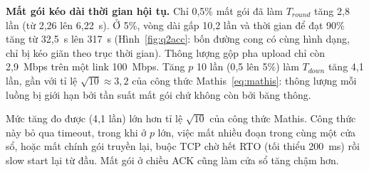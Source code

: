 \textbf{Mất gói kéo dài thời gian hội tụ.} Chỉ 0{,}5\% mất gói đã làm $T_{round}$ tăng 2{,}8 lần (từ 2{,}26 lên 6{,}22~s). Ở 5\%, vòng dài gấp 10{,}2 lần và thời gian để đạt 90\% tăng từ 32{,}5~s lên 317~s (Hình~\ref{fig:q2acc}: bốn đường cong có cùng hình dạng, chỉ bị kéo giãn theo trục thời gian). Thông lượng gộp pha upload chỉ còn 2{,}9~Mbps trên một link 100~Mbps. Tăng $p$ 10 lần (0{,}5 lên 5\%) làm $T_{down}$ tăng 4{,}1 lần, gần với tỉ lệ $\sqrt{10} \approx 3{,}2$ của công thức Mathis~\eqref{eq:mathis}: thông lượng mỗi luồng bị giới hạn bởi tần suất mất gói chứ không còn bởi băng thông.

Mức tăng đo được (4{,}1 lần) lớn hơn tỉ lệ $\sqrt{10}$ của công thức Mathis. Công thức này bỏ qua timeout, trong khi ở $p$ lớn, việc mất nhiều đoạn trong cùng một cửa sổ, hoặc mất chính gói truyền lại, buộc TCP chờ hết RTO (tối thiểu 200~ms) rồi slow start lại từ đầu. Mất gói ở chiều ACK cũng làm cửa sổ tăng chậm hơn.

\begin{table}[H]
    \centering
    \caption{Ảnh hưởng của độ trễ chặng WAN, 100~Mbps, $N = 4$ ($T_{round}$ và TTA tính bằng giây)}
    \label{tab:q2delay}
\end{table}

